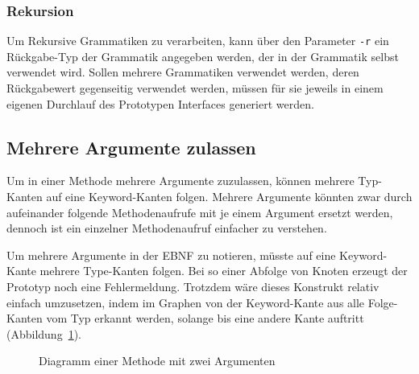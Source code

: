 \documentclass[../InterneDSLs.tex]{subfiles}
\begin{document}
\subsubsection{Rekursion}
Um Rekursive Grammatiken zu verarbeiten, kann über den Parameter \verb|-r| ein Rückgabe-Typ der Grammatik angegeben werden, der in der Grammatik selbst verwendet wird. Sollen mehrere Grammatiken verwendet werden, deren Rückgabewert gegenseitig verwendet werden, müssen für sie jeweils in einem eigenen Durchlauf des Prototypen Interfaces generiert werden.

\subsection{Mehrere Argumente zulassen}
Um in einer Methode mehrere Argumente zuzulassen, können mehrere Typ-Kanten auf eine Keyword-Kanten folgen. Mehrere Argumente könnten zwar durch aufeinander folgende Methodenaufrufe mit je einem Argument ersetzt werden, dennoch ist ein einzelner Methodenaufruf einfacher zu verstehen.

Um mehrere Argumente in der EBNF zu notieren, müsste auf eine Keyword-Kante mehrere Type-Kanten folgen. Bei so einer Abfolge von Knoten erzeugt der Prototyp noch eine Fehlermeldung. Trotzdem wäre dieses Konstrukt relativ einfach umzusetzen, indem im Graphen von der Keyword-Kante aus alle Folge-Kanten vom Typ \gqq{TYPE]} erkannt werden, solange bis eine andere Kante auftritt (Abbildung~\ref{FIG:DiagramMethodTwoArguments}).

\begin{figure}[ht]
\centering
{}
\caption{Diagramm einer Methode mit zwei Argumenten}
\label{FIG:DiagramMethodTwoArguments}
\end{figure}
\end{document}
